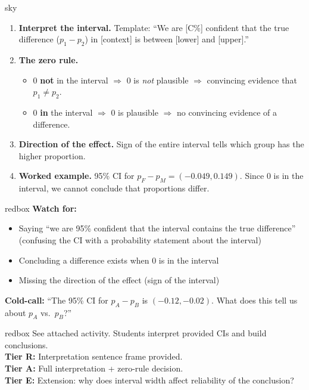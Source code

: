 \documentclass[10pt]{article}
\begin{document}
\begin{skillbox}[Lesson]{sky}
    \begin{enumerate}[leftmargin=1.4em, label=\arabic*.]
        \item \textbf{Interpret the interval.} Template: ``We are [C\%] confident that the true
              difference ($p_1-p_2$) in [context] is between [lower] and [upper].''

        \item \textbf{The zero rule.}
              \begin{itemize}
                \item 0 \textbf{not} in the interval $\Rightarrow$ 0 is \textit{not} plausible
                      $\Rightarrow$ convincing evidence that $p_1 \ne p_2$.
                \item 0 \textbf{in} the interval $\Rightarrow$ 0 is plausible
                      $\Rightarrow$ no convincing evidence of a difference.
              \end{itemize}

        \item \textbf{Direction of the effect.} Sign of the entire interval tells which group
              has the higher proportion.

        \item \textbf{Worked example.} 95\% CI for $p_F - p_M = (-0.049, 0.149)$.
              Since 0 is in the interval, we cannot conclude that proportions differ.
    \end{enumerate}
\end{skillbox}

\begin{skillbox}{redbox}
    \textbf{Watch for:}
    \begin{itemize}[leftmargin=1.2em]
        \item Saying ``we are 95\% confident that the interval contains the true difference''
              (confusing the CI with a probability statement about the interval)
        \item Concluding a difference exists when 0 is in the interval
        \item Missing the direction of the effect (sign of the interval)
    \end{itemize}
    \textbf{Cold-call:} ``The 95\% CI for $p_A - p_B$ is $(-0.12, -0.02)$.
    What does this tell us about $p_A$ vs.\ $p_B$?''
\end{skillbox}

\begin{skillbox}{redbox}
    See attached activity. Students interpret provided CIs and build conclusions.\\[4pt]
    \textbf{Tier R:} Interpretation sentence frame provided.\\
    \textbf{Tier A:} Full interpretation + zero-rule decision.\\
    \textbf{Tier E:} Extension: why does interval width affect reliability of the conclusion?
\end{skillbox}
\end{document}
